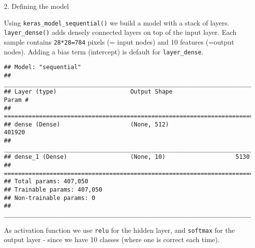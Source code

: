 \documentclass[10pt,ignorenonframetext,]{beamer}
\newenvironment{Shaded}{\begin{snugshade}}{\end{snugshade}}
\newcommand{\DataTypeTok}[1]{\textcolor[rgb]{0.13,0.29,0.53}{#1}}
\newcommand{\DecValTok}[1]{\textcolor[rgb]{0.00,0.00,0.81}{#1}}
\newcommand{\KeywordTok}[1]{\textcolor[rgb]{0.13,0.29,0.53}{\textbf{#1}}}
\newcommand{\NormalTok}[1]{#1}
\newcommand{\OperatorTok}[1]{\textcolor[rgb]{0.81,0.36,0.00}{\textbf{#1}}}
\newcommand{\StringTok}[1]{\textcolor[rgb]{0.31,0.60,0.02}{#1}}
\begin{document}
\begin{frame}[fragile]

\begin{block}{2. Defining the model}

\vspace{2mm}

Using \texttt{keras\_model\_sequential()} we build a model with a stack
of layers. \texttt{layer\_dense()} adds densely connected layers on top
of the input layer. Each sample contains \texttt{28*28=784} pixels (=
input nodes) and 10 features (=output nodes). Adding a bias term
(intercept) is default for \texttt{layer\_dense}.

\scriptsize

\begin{Shaded}
\end{Shaded}

\begin{verbatim}
## Model: "sequential"
## ___________________________________________________________________________
## Layer (type)                     Output Shape                  Param #     
## ===========================================================================
## dense (Dense)                    (None, 512)                   401920      
## ___________________________________________________________________________
## dense_1 (Dense)                  (None, 10)                    5130        
## ===========================================================================
## Total params: 407,050
## Trainable params: 407,050
## Non-trainable params: 0
## ___________________________________________________________________________
\end{verbatim}

\vspace{2mm}

\normalsize

As activation function we use \texttt{relu} for the hidden layer, and
\texttt{softmax} for the output layer - since we have 10 classes (where
one is correct each time).

\end{block}

\end{frame}
\end{document}
